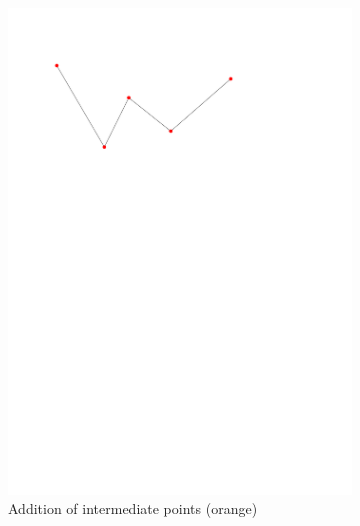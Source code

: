 \begin{figure}
\begin{subfigure}[b]{0.35\linewidth}
    \includegraphics[width=\textwidth,page=3]{figs/1Ddensop.pdf}
    \caption{Addition of intermediate points (orange)}\label{fig:1Ddensop:c}
  \end{subfigure}
  \quad
  \begin{subfigure}[b]{0.35\linewidth}
    \centering

\end{subfigure}
\end{figure}

